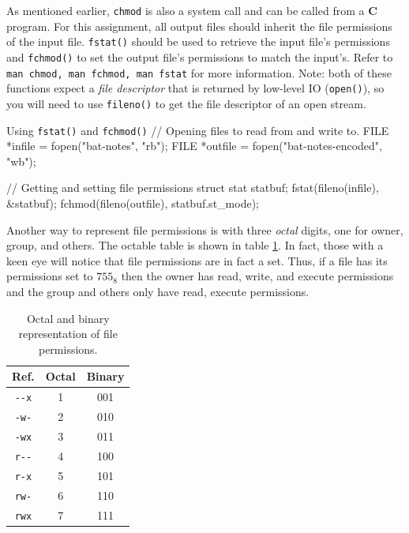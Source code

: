 \documentclass[11pt]{article}
\begin{document}
As mentioned earlier, \texttt{chmod} is also a system call and can be
called from a \textbf{C} program.  For this assignment, all output files
should inherit the file permissions of the input file. \texttt{fstat()}
should be used to retrieve the input file's permissions and
\texttt{fchmod()} to set the output file's permissions to match the
input's. Refer to \texttt{man chmod, man fchmod, man fstat} for more
information.  Note: both of these functions expect a \emph{file
descriptor} that is returned by low-level IO (\texttt{open()}), so you
will need to use \texttt{fileno()} to get the file descriptor of an open
stream.

\begin{codelisting}{Using \texttt{fstat()} and \texttt{fchmod()}}
 // Opening files to read from and write to.
 FILE *infile = fopen("bat-notes", "rb");
 FILE *outfile = fopen("bat-notes-encoded", "wb");

 // Getting and setting file permissions
 struct stat statbuf;
 fstat(fileno(infile), &statbuf);
 fchmod(fileno(outfile), statbuf.st_mode);
\end{codelisting}

Another way to represent file permissions is with three \emph{octal}
digits, one for owner, group, and others.  The octable table is shown in
table \ref{octal}. In fact, those with a keen eye will notice that file
permissions are in fact a set. Thus, if a file has its permissions set
to $755_8$ then the owner has read, write, and execute permissions and
the group and others only have read, execute permissions.

\begin{table}[h]
\centering
\begin{tabular}{ |c|c|c| }
 \hline
  Ref. & Octal & Binary \\
  \hline
  \texttt{-{}-x} & 1 & 001 \\
  \texttt{-w-} & 2 & 010 \\
  \texttt{-wx} & 3 & 011 \\
  \texttt{r-{}-} & 4 & 100 \\
  \texttt{r-x} & 5 & 101 \\
  \texttt{rw-} & 6 & 110 \\
  \texttt{rwx} & 7 & 111 \\
 \hline

 \hline
\end{tabular}
\caption{Octal and binary representation of file permissions.}
\label{octal}
\end{table}
\end{document}
